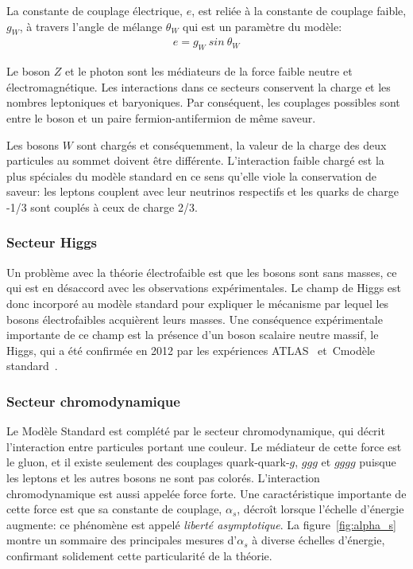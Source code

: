 
La constante de couplage électrique, $e$, est reliée à la constante de
couplage faible, $g_W$, à travers l'angle de mélange $\theta_W$ qui
est un paramètre du modèle: 
\begin{eqnarray}
\label{eq:egw}
  e = g_W\ sin\ \theta_W
\end{eqnarray}

Le boson $Z$ et le photon sont les médiateurs de la force faible
neutre et électromagnétique. Les interactions dans ce secteurs
conservent la charge et les nombres leptoniques et baryoniques. Par
conséquent, les couplages possibles sont entre le boson et un paire
fermion-antifermion de même saveur.

Les bosons $W$ sont chargés et conséquemment, la valeur de la charge
des deux particules au sommet doivent être différente. L'interaction
faible chargé est la plus spéciales du modèle standard en ce sens
qu'elle viole la conservation de saveur: les leptons couplent avec
leur neutrinos respectifs et les quarks de charge -1/3 sont
couplés à ceux de charge 2/3.

\subsubsection{Secteur Higgs}
Un problème avec la théorie électrofaible est que les bosons sont sans
masses, ce qui est en désaccord avec les observations
expérimentales. Le champ de Higgs est donc incorporé au modèle
standard pour expliquer le mécanisme par lequel les bosons
électrofaibles acquièrent leurs masses. Une conséquence expérimentale
importante de ce champ est la présence d'un boson scalaire neutre
massif, le Higgs, qui a été confirmée en 2012 par les expériences
ATLAS~\cite{aad_observation_2012}
et~Cmodèle standard~\cite{chatrchyan_observation_2012}.

\subsubsection{Secteur chromodynamique}
Le Modèle Standard est complété par le secteur chromodynamique, qui
décrit l'interaction entre particules portant une couleur. Le
médiateur de cette force est le gluon, et il existe seulement des
couplages quark-quark-$g$, $ggg$ et $gggg$ puisque les leptons et les
autres bosons ne sont pas colorés. L'interaction chromodynamique est
aussi appelée force forte. Une caractéristique importante de cette
force est que sa constante de couplage, $\alpha_s$, décroît lorsque
l'échelle d'énergie augmente: ce phénomène est appelé \emph{liberté
  asymptotique}. La figure~\ref{fig:alpha_s} montre un sommaire des
principales mesures d'$\alpha_s$ à diverse échelles d'énergie,
confirmant solidement cette particularité de la théorie.

